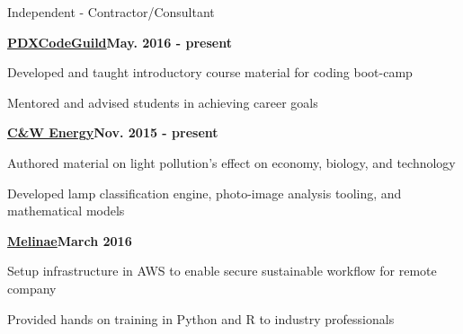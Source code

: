 \documentclass{article}
\newenvironment{mylist}[2]{
  \subsubsection*{#1}
  \begin{multicols}{#2}
  \small
  \begin{list}{}{}
   \setlength{\topsep}{0pt}
   \setlength{\itemsep}{1pt}
   \setlength{\parskip}{0pt}
   \setlength{\parsep}{0pt}}{\end{list}\end{multicols}\normalsize}
\newenvironment{*mylist}[2]{
  \subsubsection*{#1\hfill\small#2}
  \small
  \begin{list}{}{}
   \setlength{\topsep}{0pt}
   \setlength{\itemsep}{1pt}
   \setlength{\parskip}{0pt}
   \setlength{\parsep}{0pt}}{\end{list}\normalsize}
\newcommand{\LU}[1]{\hspace{-1em}{\bf Languages Used : #1}}
\def\bsp{-.3in}
\begin{document}
\begin{comment}
\hrulefill

\begin{mylist}{Language Experience :}{4}
\item Strongly Typed
\item Functional
\item Imperative
\item Scripting
\item Markup
\item Object Oriented
\item Mathematical
\item Probabilistic
\end{mylist}
\end{comment}

\begin{comment}
\begin{*mylist}{Software :}{}
\item Git, Mercurial, SVN
\item FreeBSD, Various Linux Distributions
\item Windows XP,7
\end{*mylist}
\end{comment}

\newcommand{\BSec}[1]{
\vspace{1em}
\noindent{\hspace{\bsp} \LARGE{\bf #1}{ }\hrulefill}}
\BSec{Work Experience}

\TabPositions{2in} %
\def\tabb{\tab- }  %

\begin{*mylist}{Independent \tabb Contractor/Consultant}{}
\item \hspace{-1em}
  \href{http://pdxcodeguild.com/}{\bf{PDXCodeGuild}}\hfill{\bf{May. 2016 - present}}
\item Developed and taught introductory course material for coding boot-camp
\item Mentored and advised students in achieving career goals
\item \hspace{-1em}
  \href{http://cwenergyusa.com/star-friendly/}{\bf{C\&W Energy}}\hfill{\bf{Nov. 2015 - present}}
\item Authored material on light pollution's effect on economy, biology, and technology
\item Developed lamp classification engine, photo-image analysis tooling, and mathematical models
\item \hspace{-1em}
  \href{http://www.melinae.com/}{\bf{Melinae}}\hfill{\bf{March 2016}}
\item Setup infrastructure in AWS to enable secure sustainable workflow for remote company
\item Provided hands on training in Python and R to industry professionals
\item \LU{Python, R, AWS, PostgreSQL}
\end{*mylist}
\end{document}
